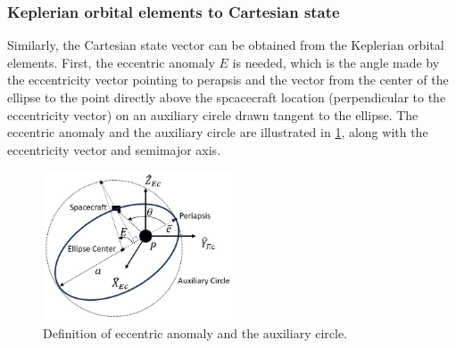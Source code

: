 \subsubsection{Keplerian orbital elements to Cartesian state}
Similarly, the Cartesian state vector can be obtained from the Keplerian orbital elements. First,
the eccentric anomaly $E$ is needed, which is the angle made by the eccentricity vector pointing to
perapsis and the vector from the center of the ellipse to the point directly above the spcacecraft
location (perpendicular to the eccentricity vector) on an auxiliary circle drawn tangent to the
ellipse. The eccentric anomaly and the auxiliary circle are illustrated in \cref{fig:auxCircle}, along
with the eccentricity vector and semimajor axis.

\begin{figure}[ht]
    \centering
    \includegraphics[width=0.5\textwidth]{figures/AuxCircle.jpg}
    \caption{Definition of eccentric anomaly and the auxiliary circle.}
    \label{fig:auxCircle}
\end{figure}

